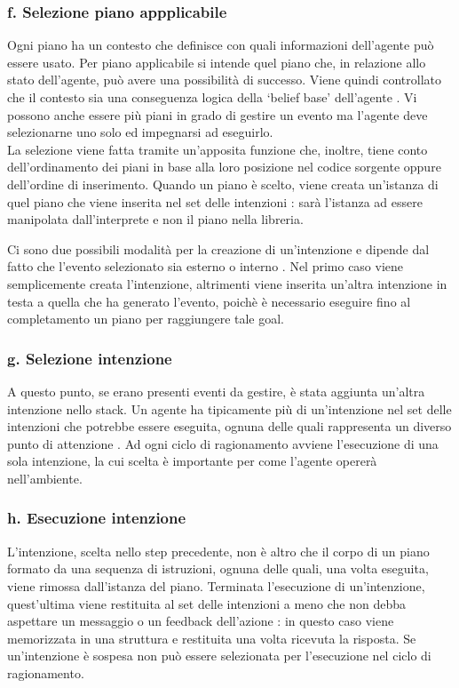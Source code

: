 \subsubsection{f. Selezione piano appplicabile}
Ogni piano ha un contesto che definisce con quali informazioni dell'agente può essere usato.
Per piano applicabile si intende quel piano che, in relazione allo stato dell'agente, può avere una possibilità di successo.
Viene quindi controllato che il contesto sia una conseguenza logica della `belief base' dell'agente \cite{AgentSpeakInJason}. Vi possono anche essere più piani in grado di gestire un evento ma l'agente deve selezionarne uno solo ed impegnarsi ad eseguirlo.
\\
La selezione viene fatta tramite un'apposita funzione che, inoltre, tiene conto dell'ordinamento dei piani in base alla loro posizione nel codice sorgente oppure dell'ordine di inserimento. Quando un piano è scelto, viene creata un'istanza di quel piano che viene inserita nel set delle intenzioni \cite{AgentSpeakInJason}: sarà l'istanza ad essere manipolata dall'interprete e non il piano nella libreria.

Ci sono due possibili modalità per la creazione di un'intenzione e dipende dal fatto che l'evento selezionato sia esterno o interno \cite{AgentSpeakInJason}. Nel primo caso viene semplicemente creata l'intenzione, altrimenti viene inserita un'altra intenzione in testa a quella che ha generato l'evento, poichè è necessario eseguire fino al completamento un piano per raggiungere tale goal.

\subsubsection{g. Selezione intenzione}
A questo punto, se erano presenti eventi da gestire, è stata aggiunta un'altra intenzione nello stack. Un agente ha tipicamente più di un'intenzione nel set delle intenzioni che potrebbe essere eseguita, ognuna delle quali rappresenta un diverso punto di attenzione \cite{AgentSpeakInJason}. Ad ogni ciclo di ragionamento avviene l'esecuzione di una sola intenzione, la cui scelta è importante per come l'agente opererà nell'ambiente.

\subsubsection{h. Esecuzione intenzione}
L'intenzione, scelta nello step precedente, non è altro che il corpo di un piano formato da una sequenza di istruzioni, ognuna delle quali, una volta eseguita, viene rimossa dall'istanza del piano.
Terminata l'esecuzione di un'intenzione, quest'ultima viene restituita al set delle intenzioni a meno che non debba aspettare un messaggio o un feedback dell'azione \cite{AgentSpeakInJason}: in questo caso viene memorizzata in una struttura e restituita una volta ricevuta la risposta.
Se un'intenzione è sospesa non può essere selezionata per l'esecuzione nel ciclo di ragionamento.

